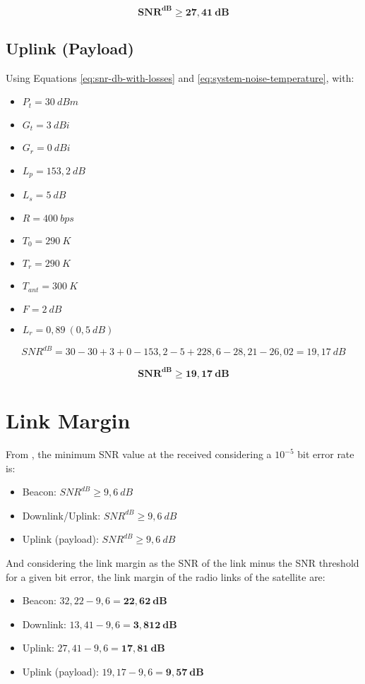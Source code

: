 \begin{equation}
    \mathbf{SNR^{dB} \geq 27,41\ dB}
\end{equation}

\subsection{Uplink (Payload)}

Using Equations \ref{eq:snr-db-with-losses} and \ref{eq:system-noise-temperature}, with:

\begin{itemize}
    \item $P_{t} = 30\ dBm$
    \item $G_{t} = 3\ dBi$
    \item $G_{r} = 0\ dBi$
    \item $L_{p} = 153,2\ dB$
    \item $L_{s} = 5\ dB$
    \item $R = 400\ bps$
    \item $T_{0} = 290\ K$
    \item $T_{r} = 290\ K$
    \item $T_{ant} = 300\ K$
    \item $F = 2\ dB$
    \item $L_{r} = 0,89\ (0,5\ dB)$
\end{itemize}

\begin{equation}
    SNR^{dB} = 30 - 30 + 3 + 0 - 153,2 - 5 + 228,6 - 28,21 - 26,02 = 19,17\ dB
\end{equation}

\begin{equation}
    \mathbf{SNR^{dB} \geq 19,17\ dB}
\end{equation}

\section{Link Margin}

From \cite{larson2005}, the minimum SNR value at the received considering a $10^{-5}$ bit error rate is:

\begin{itemize}
    \item Beacon: $SNR^{dB} \geq 9,6\ dB$
    \item Downlink/Uplink: $SNR^{dB} \geq 9,6\ dB$
    \item Uplink (payload): $SNR^{dB} \geq 9,6\ dB$
\end{itemize}

And considering the link margin as the SNR of the link minus the SNR threshold for a given bit error, the link margin of the radio links of the satellite are:

\begin{itemize}
    \item Beacon: $32,22 - 9,6 = \mathbf{22,62\ dB}$
    \item Downlink: $13,41 - 9,6 = \mathbf{3,812\ dB}$
    \item Uplink: $27,41 - 9,6 = \mathbf{17,81\ dB}$
    \item Uplink (payload): $19,17 - 9,6 = \mathbf{9,57\ dB}$
\end{itemize}
